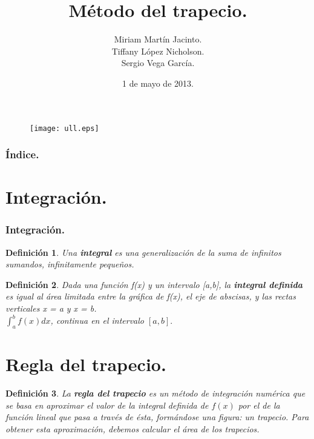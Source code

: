 \documentclass{beamer}
\title[Integración]{Método del trapecio.}
\author[Grupo-2D]{Miriam Martín Jacinto.\\Tiffany López Nicholson.\\Sergio Vega García.}
\date[01/05/2013]{1 de mayo de 2013.}
\newtheorem{definicion}{Definición}
\begin{document}
  \begin{frame}
    \begin{figure}[lt]
      \texttt{[image: ull.eps]}
    \end{figure}
    \titlepage
  \end{frame}
  \begin{frame}
    \frametitle{Índice.}
    \tableofcontents[pausesections]
  \end{frame}
  \section{Integración.}
  \begin{frame}
    \frametitle{Integración.}
      \begin{definicion}
	Una \textbf{integral} es una generalización de la suma de infinitos sumandos, infinitamente pequeños.
      \end{definicion}
	
      \begin{definicion}
	Dada una función f(x) y un intervalo [a,b], la \textbf{integral definida} es igual al área limitada entre la gráfica de f(x), el eje de abscisas, y las rectas verticales x = a y x = b.\\
	$\int_{a}^{b} f(x) dx$, continua en el intervalo $[a, b].$
      \end{definicion}
  \end{frame}
  \section{Regla del trapecio.}
  \begin{frame}
    \begin{definicion}
      La \textbf{regla del trapecio} es un método de integración numérica que se basa en aproximar el valor de la integral definida de $f(x)$ por el de la función lineal que pasa a través de ésta, formándose una figura: un trapecio. Para obtener esta aproximación, debemos calcular el área de los trapecios.
    \end{definicion}
  \end{frame}
\end{document}

